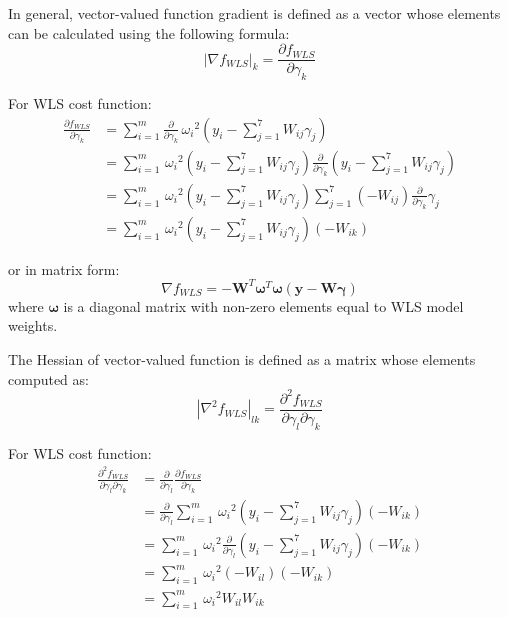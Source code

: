 In general, vector-valued function gradient is defined as a vector whose elements can be calculated using the following formula:
\begin{equation}
\left|\nabla{f_{WLS}}\right|_k = \frac{\partial{f_{WLS}}}{\partial{\gamma_k}}
\label{Eq:m6_eq_9}
\end{equation}

For WLS cost function:
\begin{equation}
\begin{aligned}
\frac{\partial{f_{WLS}}}{\partial{\gamma_k}}&=\sum_{i=1}^{m}\frac{\partial}{\partial{\gamma_k}}\,{\omega_i}^2\left(y_i-\sum_{j=1}^{7}W_{ij}\gamma_j\right)\\
& = \sum_{i=1}^{m}\,{\omega_i}^2\left(y_i-\sum_{j=1}^{7}W_{ij}\gamma_j\right)\frac{\partial}{\partial{\gamma_k}}\left(y_i-\sum_{j=1}^{7}W_{ij}\gamma_j\right)\\
& = \sum_{i=1}^{m}\,{\omega_i}^2\left(y_i-\sum_{j=1}^{7}W_{ij}\gamma_j\right)\sum_{j=1}^{7}\left(-W_{ij}\right)\frac{\partial}{\partial{\gamma_k}}\gamma_j\\
& = \sum_{i=1}^{m}\,{\omega_i}^2\left(y_i-\sum_{j=1}^{7}W_{ij}\gamma_j\right)\left(-W_{ik}\right)
\end{aligned}
\label{Eq:m6_eq_10}
\end{equation}

or in matrix form:
\begin{equation}
\nabla{f_{WLS}}=-\boldsymbol{W}^T\boldsymbol{\omega}^T\boldsymbol{\omega}\left(\boldsymbol{y}-\boldsymbol{W\gamma}\right)
\label{Eq:m6_eq_11}
\end{equation}
where $\boldsymbol{\omega}$ is a diagonal matrix with non-zero elements equal to WLS model weights.

The Hessian of vector-valued function is defined as a matrix whose elements computed as:
\begin{equation}
\left|\nabla^2{f_{WLS}}\right|_{lk} = \frac{\partial^2{f_{WLS}}}{\partial{\gamma_l}\partial{\gamma_k}}
\label{Eq:m6_eq_12}
\end{equation}

For WLS cost function:
\begin{equation}
\begin{aligned}
\frac{\partial^2{f_{WLS}}}{\partial{\gamma_l}\partial{\gamma_k}} &= \frac{\partial}{\partial{\gamma_l}}\frac{\partial{f_{WLS}}}{\partial{\gamma_k}}\\
&=\frac{\partial}{\partial{\gamma_l}}\sum_{i=1}^{m}\,{\omega_i}^2\left(y_i-\sum_{j=1}^{7}W_{ij}\gamma_j\right)\left(-W_{ik}\right)\\
&=\sum_{i=1}^{m}\,{\omega_i}^2\frac{\partial}{\partial{\gamma_l}}\left(y_i-\sum_{j=1}^{7}W_{ij}\gamma_j\right)\left(-W_{ik}\right)\\
&=\sum_{i=1}^{m}\,{\omega_i}^2\left(-W_{il}\right)\left(-W_{ik}\right)\\
&=\sum_{i=1}^{m}\,{\omega_i}^2 W_{il}W_{ik}\\
\end{aligned}
\label{Eq:m6_eq_13}
\end{equation}

